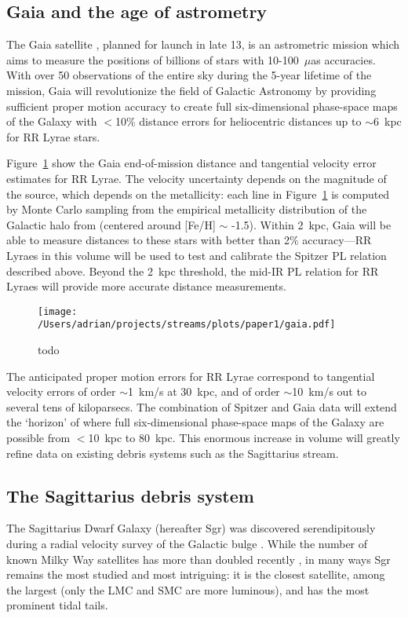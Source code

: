 \documentclass[preprint]{aastex}
\begin{document}
\subsection{Gaia and the age of astrometry}
\label{sec:gaia}
The Gaia satellite \citep{gaia01}, planned for launch in late
13, is an astrometric mission which aims to measure the positions of billions of stars with
10-100~$\mu$as accuracies. With over 50 observations of the entire sky
during the 5-year lifetime of the mission, Gaia will
revolutionize the field of Galactic Astronomy by providing sufficient
proper motion accuracy to create full six-dimensional phase-space
maps of the Galaxy with $<$10\% distance errors for heliocentric distances up to $\sim$6~kpc for RR Lyrae stars.

Figure~\ref{fig:gaia_errors} show the Gaia end-of-mission distance and
tangential velocity error estimates for RR Lyrae. The velocity uncertainty depends on the magnitude of the source, which depends on the metallicity: each line in Figure~\ref{fig:gaia_errors} is computed by Monte Carlo sampling from the empirical metallicity distribution of the Galactic halo from \cite{ivezic08} (centered around [Fe/H] $\sim$ -1.5). Within 2~kpc, Gaia
will be able to measure distances to these stars with better than 2\%
accuracy---RR Lyraes in this volume will be used to test and calibrate
the Spitzer PL relation described above. Beyond the 2~kpc threshold,
the mid-IR PL relation for RR Lyraes will provide more accurate
distance measurements.

\begin{figure}[h]
\begin{center}
\texttt{[image: /Users/adrian/projects/streams/plots/paper1/gaia.pdf]}
\caption{ todo }\label{fig:gaia_errors}
\end{center}
\end{figure}

The anticipated proper motion errors for RR Lyrae correspond to
tangential velocity errors of order $\sim$1~km/s at 30~kpc, and of
order $\sim$10~km/s out to several tens of kiloparsecs. The
combination of Spitzer and Gaia data will extend the `horizon' of
where full six-dimensional phase-space maps of the Galaxy are possible
from $<$10~kpc to 80~kpc. This enormous increase in volume will greatly refine
data on existing debris systems such as the Sagittarius stream.

\subsection{The Sagittarius debris system}
\label{sec:sgr}
The Sagittarius Dwarf Galaxy (hereafter Sgr) was discovered
serendipitously during a radial velocity survey of the Galactic bulge
\citep{ibata94}. While the number of known Milky Way satellites has
more than doubled recently \citep[e.g.,][]{mcconnachie12}, in many
ways Sgr remains the most studied and most intriguing: it is the
closest satellite, among the largest (only the LMC and SMC are more
luminous), and has the most prominent tidal tails.
\end{document}
